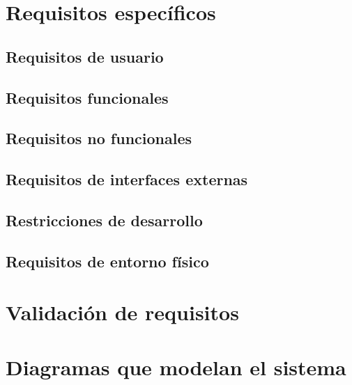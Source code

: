 \chapter{Requisitos específicos}\label{chap:requirements}

\section{Requisitos de usuario}\label{sec:user-req}

\section{Requisitos funcionales}\label{sec:functional-req}

\section{Requisitos no funcionales}\label{sec:non-functional-req}

\section{Requisitos de interfaces externas}\label{sec:external-if-req}

\section{Restricciones de desarrollo}\label{sec:dev-restrictions}

\section{Requisitos de entorno físico}\label{sec:phisical-req}


\appendix
\chapter{Validación de requisitos}\label{chap:validation}

\chapter{Diagramas que modelan el sistema}\label{chap:diagrams}

